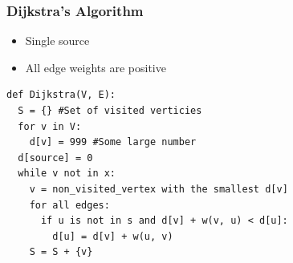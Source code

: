 \documentclass[11pt]{article}
\begin{document}
\subsubsection*{Dijkstra's Algorithm}
\label{sec:orgb528f62}
\begin{itemize}
\item Single source
\item All edge weights are positive
\end{itemize}
\begin{verbatim}
def Dijkstra(V, E):
  S = {} #Set of visited verticies
  for v in V:
    d[v] = 999 #Some large number
  d[source] = 0
  while v not in x:
    v = non_visited_vertex with the smallest d[v]
    for all edges:
      if u is not in s and d[v] + w(v, u) < d[u]:
        d[u] = d[v] + w(u, v)
    S = S + {v}
\end{verbatim}
\end{document}
